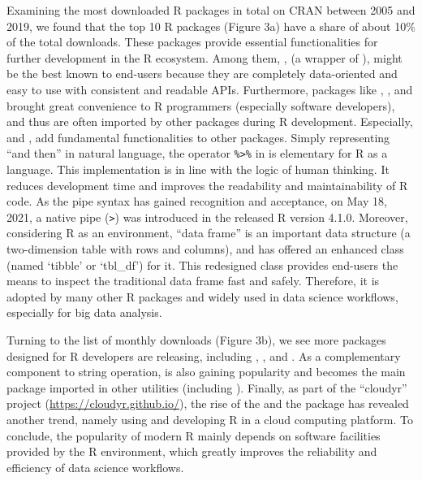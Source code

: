 Examining the most downloaded R packages in total on CRAN between 2005
and 2019, we found that the top 10 R packages (Figure 3a) have a share
of about 10\% of the total downloads. These packages provide essential
functionalities for further development in the R ecosystem. Among them,
,  (a wrapper of ),
 might be the best known to end-users because they are
completely data-oriented and easy to use with consistent and readable
APIs. Furthermore, packages like , ,
 and  brought great convenience to R
programmers (especially software developers), and thus are often
imported by other packages during R development. Especially,
 and , add fundamental functionalities
to other packages. Simply representing ``and then'' in natural language,
the operator \texttt{\%\textgreater{}\%} in  is
elementary for R as a language. This implementation is in line with the
logic of human thinking. It reduces development time and improves the
readability and maintainability of R code. As the pipe syntax has gained
recognition and acceptance, on May 18, 2021, a native pipe
(\texttt{\textbar{}\textgreater{}}) was introduced in the released R
version 4.1.0. Moreover, considering R as an environment, ``data frame''
is an important data structure (a two-dimension table with rows and
columns), and  has offered an enhanced class (named
`tibble' or `tbl\_df') for it. This redesigned class provides end-users
the means to inspect the traditional data frame fast and safely.
Therefore, it is adopted by many other R packages and widely used in
data science workflows, especially for big data analysis.

Turning to the list of monthly downloads (Figure 3b), we see more
packages designed for R developers are releasing, including
, ,  and
. As a complementary component to string operation,
 is also gaining popularity and becomes the main package
imported in other utilities (including ). Finally, as
part of the ``cloudyr'' project (\url{https://cloudyr.github.io/}), the
rise of the  and the  package
has revealed another trend, namely using and developing R in a cloud
computing platform. To conclude, the popularity of modern R mainly
depends on software facilities provided by the R environment, which
greatly improves the reliability and efficiency of data science
workflows.

